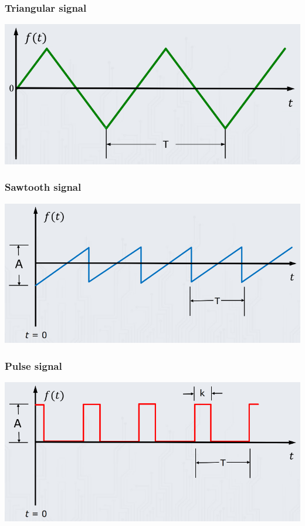 \documentclass[11pt]{article}
\begin{document}
\subsubsection{Triangular signal}
\label{sec:orgbc54661}
\begin{center}
\includegraphics[width=.9\linewidth]{./images/trianglular-signal.png}
\end{center}
\subsubsection{Sawtooth signal}
\label{sec:org20ae222}
\begin{center}
\includegraphics[width=.9\linewidth]{./images/sawtooth-signal.png}
\end{center}
\subsubsection{Pulse signal}
\label{sec:orgde6d19f}
\begin{center}
\includegraphics[width=.9\linewidth]{./images/pulse-signal.png}
\end{center}
\end{document}
